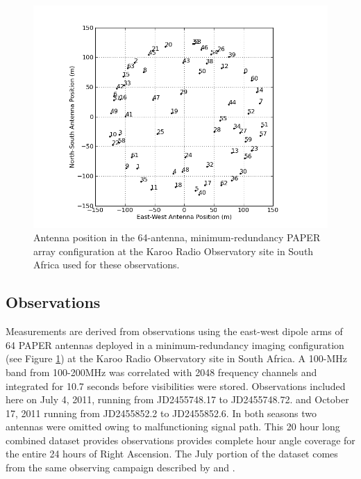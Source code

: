\documentclass[preprint]{aastex}
\begin{document}

\begin{figure}\centering
\includegraphics[width=0.85\columnwidth]{plots/antpos.png}
\caption{Antenna position in the 64-antenna, minimum-redundancy PAPER array configuration at the Karoo Radio Observatory site in South Africa used for these observations.
}\label{fig:antpos}
\end{figure}

\subsection{Observations}

 Measurements are derived from observations using  the east-west dipole arms of
64 PAPER antennas deployed in a minimum-redundancy imaging configuration
(see Figure \ref{fig:antpos})
at the Karoo Radio Observatory site in South Africa.
A 100-MHz band from 100-200MHz was correlated
with 2048 frequency channels and integrated for 10.7 seconds before
visibilities were stored.  Observations included here on  July 4, 2011, running
from JD2455748.17 to JD2455748.72. and October 17, 2011 running from
JD2455852.2 to JD2455852.6.  In both seasons two antennas were omitted owing to
malfunctioning signal path. This 20 hour long combined dataset provides
observations provides complete hour angle coverage for the entire 24 hours of
Right Ascension. The July portion of the dataset comes from the same observing
campaign described by \cite{Pober:2013p9567} and \cite{Stefan:2012p9707}. 
\end{document}
